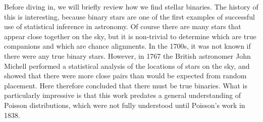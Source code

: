Before diving in, we will briefly review how we find stellar binaries. The history of this is interesting, because binary stars are one of the first examples of successful use of statistical inference in astronomy. Of course there are many stars that appear close together on the sky, but it is non-trivial to determine which are true companions and which are chance alignments. In the 1700s, it was not known if there were any true binary stars. However, in 1767 the British astronomer John Michell performed a statistical analysis of the locations of stars on the sky, and showed that there were more close pairs than would be expected from random placement. Here therefore concluded that there must be true binaries. What is particularly impressive is that this work predates a general understanding of Poisson distributions, which were not fully understood until Poisson's work in 1838.

